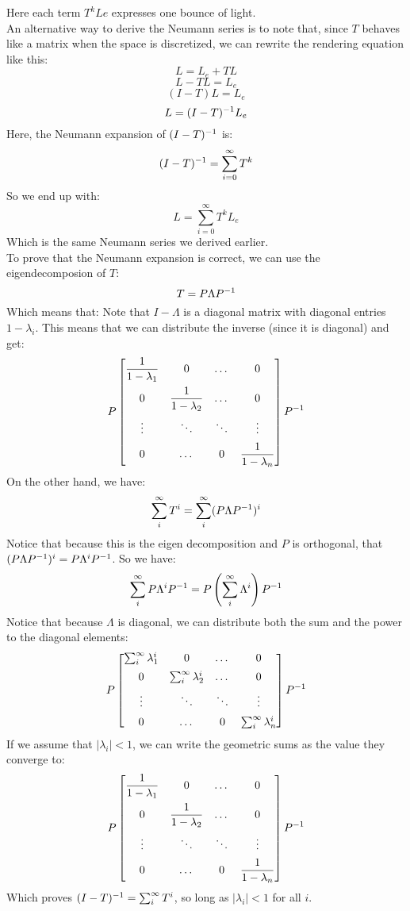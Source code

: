 \documentclass[12pt]{article}
\begin{document}
Here each term $T^kLe$ expresses one bounce of light. \\

An alternative way to derive the Neumann series
is to note that, since $T$ behaves like a matrix
when the space is discretized, we can rewrite
the rendering equation like this:
\[ L = L_e + TL \]
\[ L - TL = L_e \]
\[ (I - T)L = L_e \]
\[ L = (I-T)^{-1} L_e \]
Here, the Neumann expansion of $(I-T)^{-1}$ is:
\[ (I-T)^{-1} = \sum_{i=0}^\infty T^k \]
So we end up with:
\[ L = \sum_{i=0}^\infty T^kL_e \]
Which is the same Neumann series we derived earlier. \\

To prove that the Neumann expansion is correct,
we can use the eigendecomposion of $T$:
\[ T = P\Lambda P^{-1} \]
Which means that:
Note that $I - \Lambda$
is a diagonal matrix with diagonal entries
$1 - \lambda_i$. This means that
we can distribute the inverse (since it is
diagonal) and get:
\[ P \bmat{ 
\dfrac{1}{1-\lambda_1} & 0 & \dots & 0 \vs{5} \\
0 & \dfrac{1}{1-\lambda_2} & \dots & 0 \vs{5} \\
\vdots & \ddots & \ddots & \vdots \vs{5} \\
0 & \dots & 0 & \dfrac{1}{1-\lambda_n} } P\inv \]
On the other hand, we have:
 \[ \sum_i^{\infty} T^i
= \sum_i^{\infty} (P\Lambda P^{-1})^i \]
Notice that because this is the eigen decomposition
and $P$ is orthogonal,
that $(P\Lambda P^{-1})^i = P\Lambda^i P^{-1}$.
So we have:
\[ \sum_i^{\infty} P\Lambda^i P^{-1}
= P \left( \sum_i^{\infty}\Lambda^i \right) P^{-1} \]
Notice that because $\Lambda$ 
is diagonal, we can distribute both the 
sum and the power to the diagonal elements:
\[ P \bmat{ 
\sum_i^{\infty} \lambda_1^i & 0 & \dots & 0 \vs{5} \\
0 & \sum_i^{\infty} \lambda_2^i & \dots & 0 \vs{5} \\
\vdots & \ddots & \ddots & \vdots \vs{5} \\
0 & \dots & 0 & \sum_i^{\infty} \lambda_n^i } P\inv \]
If we assume that $|\lambda_i| < 1$,
we can write the geometric sums
as the value they converge to:
\[ P \bmat{ 
\dfrac{1}{1-\lambda_1} & 0 & \dots & 0 \vs{5} \\
0 & \dfrac{1}{1-\lambda_2} & \dots & 0 \vs{5} \\
\vdots & \ddots & \ddots & \vdots \vs{5} \\
0 & \dots & 0 & \dfrac{1}{1-\lambda_n} } P\inv \]
Which proves  $(I-T)^{-1} =  \sum_i^{\infty} T^i$,
so long as $|\lambda_i| < 1$ for all $i$. \\
\end{document}
